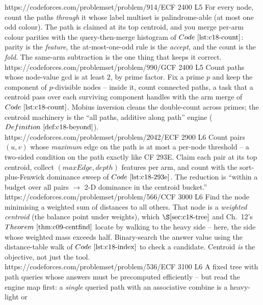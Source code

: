 \begin{mixedset}
    {https://codeforces.com/problemset/problem/914/E}{CF 2400 L5}
    {For every node, count the paths \emph{through} it whose label multiset is palindrome-able (at
     most one odd colour). The path is claimed at its top centroid, and you merge per-arm colour
     parities with the query-then-merge histogram of \(\coderef{c18-count}\): parity is the
     \emph{feature}, the at-most-one-odd rule is the \emph{accept}, and the count is the
     \emph{fold}. The same-arm subtraction is the one thing that keeps it correct.}
    {https://codeforces.com/problemset/problem/990/G}{CF 2400 L5}
    {Count paths whose node-value gcd is at least \(2\), by prime factor. Fix a prime \(p\) and keep
     the component of \(p\)-divisible nodes -- inside it, count connected paths, a task that a
     centroid pass over each surviving component handles with the arm merge of
     \(\coderef{c18-count}\). Mobius inversion cleans the double-count across primes; the centroid
     machinery is the ``all paths, additive along path'' engine
     (\(\defref{c18-beyond}\)).}
    {https://codeforces.com/problemset/problem/2042/E}{CF 2900 L6}
    {Count pairs \((u,v)\) whose \emph{maximum} edge on the path is at most a per-node threshold --
     a two-sided condition on the path exactly like CF 293E. Claim each pair at its top centroid,
     collect \((\mathit{maxEdge}, \mathit{depth})\) features per arm, and count with the sort-plus-Fenwick
     dominance sweep of \(\coderef{c18-293e}\). The reduction is ``within a budget over all
     pairs \(\to\) 2-D dominance in the centroid bucket.''}
    {https://codeforces.com/problemset/problem/566/C}{CF 3000 L6}
    {Find the node minimising a weighted sum of distances to all others. That node is a
     \emph{weighted centroid} (the balance point under weights), which \(\secref{c18-tree}\) and
     Ch.~12's \(\thmref{c09-centfind}\) locate by walking to the heavy side -- here, the side whose
     weighted mass exceeds half. Binary-search the answer value using the distance-table walk of
     \(\coderef{c18-index}\) to check a candidate. Centroid \emph{is} the objective, not just the tool.}
    {https://codeforces.com/problemset/problem/536/E}{CF 3100 L6}
    {A fixed tree with path queries whose answers must be precomputed efficiently -- but read the
     engine map first: a \emph{single} queried path with an associative combine is a heavy-light or
}
\end{mixedset}
